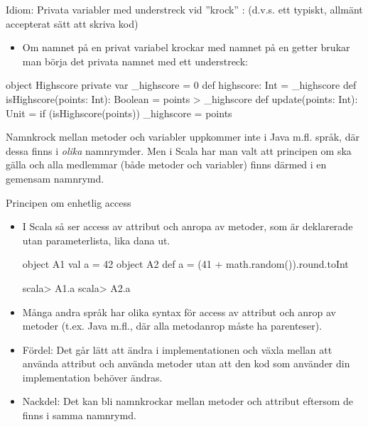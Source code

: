 \begin{Slide}{Idiom: Privata variabler med understreck vid ''krock''}\SlideFontSmall
{}: (d.v.s. ett typiskt, allmänt accepterat sätt att skriva kod)
\begin{itemize}
  \item Om namnet på en privat variabel krockar med namnet på en getter
  brukar man börja det privata namnet med ett understreck:
\end{itemize}

\begin{CodeSmall}
object Highscore {
  private var _highscore = 0
  def highscore: Int = _highscore
  def isHighscore(points: Int): Boolean = points > _highscore
  def update(points: Int): Unit = if (isHighscore(points)) _highscore = points
}
\end{CodeSmall}

\pause

{\SlideFontTiny Namnkrock mellan metoder och variabler uppkommer inte i Java m.fl. språk, där dessa finns i \emph{olika} namnrymder.
Men i Scala har man valt att principen om  ska gälla och alla medlemmar (både metoder och variabler) finns därmed i en gemensam namnrymd.}

\end{Slide}

\begin{Slide}{Principen om enhetlig access}\SlideFontSmall
  \begin{itemize}
    \item I Scala så ser access av attribut och anropa av metoder, som är deklarerade utan parameterlista, lika dana ut. 
\begin{Code}
object A1 { val a = 42 }  
object A2 { def a = (41 + math.random()).round.toInt }
\end{Code}
\begin{REPLnonum}
scala> A1.a
scala> A2.a  
\end{REPLnonum}
    \item Många andra språk har olika syntax för access av attribut och anrop av metoder (t.ex. Java m.fl., där alla metodanrop måste ha parenteser).
    \item Fördel: Det går lätt att ändra i implementationen och växla mellan att använda attribut och använda metoder utan att den kod som använder din implementation behöver ändras.
    \item Nackdel: Det kan bli namnkrockar mellan metoder och attribut eftersom de finns i samma namnrymd.
  \end{itemize}
  
\end{Slide}



